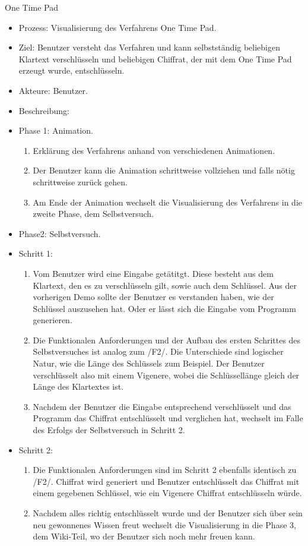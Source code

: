 \documentclass{article}
\begin{document}
\begin{FA}[start=500]
\item One Time Pad
\end{FA}

\begin{itemize}[label={}]
\item Prozess: Visualisierung des Verfahrens One Time Pad.
\item Ziel: Benutzer versteht das Verfahren und kann selbstständig beliebigen Klartext verschlüsseln und beliebigen Chiffrat, der mit dem One Time Pad erzeugt wurde, entschlüsseln.
\item Akteure: Benutzer.
\item Beschreibung:
\item Phase 1: Animation.
\begin{enumerate}
\item Erklärung des Verfahrens anhand von verschiedenen Animationen.
\item Der Benutzer kann die Animation schrittweise vollziehen und falls nötig schrittweise zurück gehen.
\item Am Ende der Animation wechselt die Visualisierung des Verfahrens in die zweite Phase, dem Selbstversuch.
\end{enumerate}

\item Phase2: Selbstversuch.
\item Schritt 1:
\begin{enumerate}
\item Vom Benutzer wird eine Eingabe getätitgt. Diese besteht aus dem Klartext, den es zu verschlüsseln gilt, sowie auch dem Schlüssel. Aus der vorherigen Demo sollte der Benutzer es verstanden haben, wie der Schlüssel auszusehen hat. Oder er lässt sich die Eingabe vom Programm generieren.
\item Die Funktionalen Anforderungen und der Aufbau des ersten Schrittes des Selbstversuches ist analog zum /F2/. Die Unterschiede sind logischer Natur, wie die Länge des Schlüssels zum Beispiel. Der Benutzer verschlüsselt also mit einem Vigenere, wobei die Schlüssellänge gleich der Länge des Klartextes ist.
\item Nachdem der Benutzer die Eingabe entsprechend verschlüsselt und das Programm das Chiffrat entschlüsselt und verglichen hat, wechselt im Falle des Erfolgs der Selbstversuch in Schritt 2.
\end{enumerate}

\item Schritt 2:
\begin{enumerate}
\item Die Funktionalen Anforderungen sind im Schritt 2 ebenfalls identisch zu /F2/. Chiffrat wird generiert und Benutzer entschlüsselt das Chiffrat mit einem gegebenen Schlüssel, wie ein Vigenere Chiffrat entschlüsseln würde.
\item Nachdem alles richtig entschlüsselt wurde und der Benutzer sich über sein neu gewonnenes Wissen freut wechselt die Visualisierung in die Phase 3, dem Wiki-Teil, wo der Benutzer sich noch mehr freuen kann.
\end{enumerate}


\end{itemize}
\end{document}

